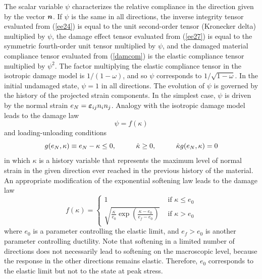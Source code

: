 \documentclass[a4paper]{article}
\newcommand{\mbf}[1]{\mbox{\boldmath$#1$}}
\newcommand{\eps} {\mbf{\varepsilon}}
\begin{document}
The scalar variable $\psi$ characterizes the relative compliance
in the direction given by the vector $\mbf{n}$.
If $\psi$ is the same in all directions,
the inverse integrity tensor  evaluated from (\ref{ee24})
is equal to the unit second-order tensor (Kronecker delta) multiplied
by $\psi$, the damage effect tensor evaluated from (\ref{ee27})
is equal to the symmetric fourth-order unit tensor multiplied
by $\psi$,
and the damaged
material compliance tensor evaluated from (\ref{damcom}) is the
elastic compliance tensor multiplied by $\psi^2$. The factor multiplying
the elastic compliance tensor in the
isotropic damage model is $1/(1-\omega)$, and so $\psi$ corresponds
to  $1/\sqrt{1-\omega}$. In the initial undamaged state,
$\psi=1$ in all directions.  The evolution of $\psi$
is governed by the history of the projected strain components.
In the simplest case, $\psi$ is driven by the normal strain
$e_N=\eps_{ij}n_in_j$. Analogy with the isotropic damage model
leads to the damage law
\begin{equation}
\psi=f(\kappa)
\end{equation}
and loading-unloading conditions
\begin{equation}
g(e_N,\kappa)\equiv e_N-\kappa\le 0, \hskip 10mm
\dot{\kappa}\ge 0, \hskip 10mm
\dot{\kappa}g(e_N,\kappa)=0
\end{equation}
in which $\kappa$ is a history variable that represents the maximum
level of normal strain in the given direction ever reached in the
previous history of the material. An appropriate modification
of the exponential softening
law leads to the damage law
\begin{equation}
\label{expsoft2}
f(\kappa)=\left\{
\begin{array}{ll}
1 & \mbox{ if } \kappa\le e_0
\\
\sqrt{\frac{\kappa}{e_0}\exp\left(\frac{\kappa-e_0}{e_f-e_0}\right)}
& \mbox{ if } \kappa>e_0
\end{array}
\right.
\end{equation}
where $e_0$ is a parameter controlling the elastic limit, and $e_f>e_0$
is another parameter controlling ductility.
Note that softening in a limited number of directions does not necessarily
lead to softening on the macroscopic level, because the response
in the other directions remains elastic. Therefore, $e_0$ corresponds
to the elastic limit but not to the state at peak stress.
\end{document}
